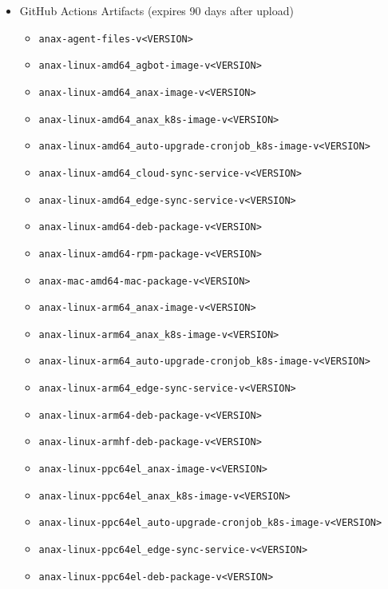 \documentclass[a4paper,11pt]{article}
\begin{document}
\begin{itemize}
\begin{itemize}
    \end{itemize}
    \item GitHub Actions Artifacts (expires 90 days after upload)
    \begin{itemize}
        \item\verb|anax-agent-files-v<VERSION>|
        \\
        \item\verb|anax-linux-amd64_agbot-image-v<VERSION>|
        \item\verb|anax-linux-amd64_anax-image-v<VERSION>|
        \item\verb|anax-linux-amd64_anax_k8s-image-v<VERSION>|
        \item\verb|anax-linux-amd64_auto-upgrade-cronjob_k8s-image-v<VERSION>|
        \item\verb|anax-linux-amd64_cloud-sync-service-v<VERSION>|
        \item\verb|anax-linux-amd64_edge-sync-service-v<VERSION>|
        \item\verb|anax-linux-amd64-deb-package-v<VERSION>|
        \item\verb|anax-linux-amd64-rpm-package-v<VERSION>|
        \item\verb|anax-mac-amd64-mac-package-v<VERSION>|
        \\
        \item\verb|anax-linux-arm64_anax-image-v<VERSION>|
        \item\verb|anax-linux-arm64_anax_k8s-image-v<VERSION>|
        \item\verb|anax-linux-arm64_auto-upgrade-cronjob_k8s-image-v<VERSION>|
        \item\verb|anax-linux-arm64_edge-sync-service-v<VERSION>|
        \item\verb|anax-linux-arm64-deb-package-v<VERSION>|
        \\
        \item\verb|anax-linux-armhf-deb-package-v<VERSION>|
        \\
        \item\verb|anax-linux-ppc64el_anax-image-v<VERSION>|
        \item\verb|anax-linux-ppc64el_anax_k8s-image-v<VERSION>|
        \item\verb|anax-linux-ppc64el_auto-upgrade-cronjob_k8s-image-v<VERSION>|
        \item\verb|anax-linux-ppc64el_edge-sync-service-v<VERSION>|
        \item\verb|anax-linux-ppc64el-deb-package-v<VERSION>|

\end{itemize}
\end{itemize}
\end{document}
